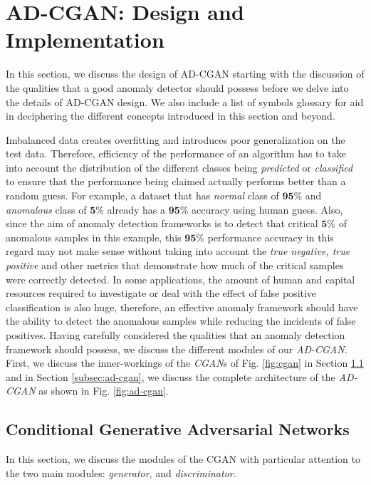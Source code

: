 \section{AD-CGAN: Design and Implementation}
\label{sec:design}
In this section, we discuss the design of AD-CGAN starting with the discussion of the qualities that a good anomaly detector should possess before we delve into the details of AD-CGAN design. We also include a list of symbols glossary for aid in deciphering the different concepts introduced in this section and beyond. \par   
Imbalanced data creates overfitting and introduces poor generalization on the test data. Therefore, efficiency of the performance of an algorithm has to take into account the distribution of the different classes being \textit{predicted} or \textit{classified} to ensure that the performance being claimed actually performs better than a random guess. For example, a dataset that has \textit{normal} class of $\bm{95\%} $ and \textit{anomalous} class of $ \bm{5\%} $ already has a $ \bm{95\%} $ accuracy using human guess. Also, since the aim of anomaly detection frameworks is to detect that critical $ \bm{5\%} $ of anomalous samples in this example, this $ \bm{95\%} $ performance accuracy in this regard may not make sense without taking into account the \textit{true negative, true positive} and other metrics that demonstrate how much of the critical samples were correctly detected. In some applications, the amount of human and capital resources required to investigate or deal with the effect of false positive classification is also huge, therefore, an effective anomaly framework should have the ability to detect the anomalous samples while reducing the incidents of false positives.
Having carefully considered the qualities that an anomaly detection framework should possess, we discuss the different modules of our \textit{AD-CGAN}. First, we discuss the inner-workings of the \textit{CGAN}s of Fig. \ref{fig:cgan} in Section \ref{subsec:gans} and in Section \ref{subsec:ad-cgan}, we discuss the complete architecture of the \textit{AD-CGAN} as shown in Fig. \ref{fig:ad-cgan}.
\glsaddall
\printglossary[title={List of Symbols}]  
\subsection{Conditional Generative Adversarial Networks}
\label{subsec:gans}
In this section, we discuss the modules of the CGAN with particular attention to the two main modules: \textit{generator}, and \textit{discriminator}.
